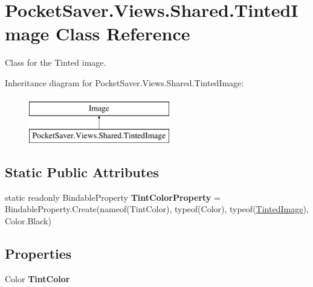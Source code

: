 \hypertarget{class_pocket_saver_1_1_views_1_1_shared_1_1_tinted_image}{}\section{Pocket\+Saver.\+Views.\+Shared.\+Tinted\+Image Class Reference}
\label{class_pocket_saver_1_1_views_1_1_shared_1_1_tinted_image}


Class for the Tinted image.  


Inheritance diagram for Pocket\+Saver.\+Views.\+Shared.\+Tinted\+Image\+:\begin{figure}[H]
\begin{center}
\leavevmode
\includegraphics[height=2.000000cm]{class_pocket_saver_1_1_views_1_1_shared_1_1_tinted_image}
\end{center}
\end{figure}
\subsection*{Static Public Attributes}
\begin{DoxyCompactItemize}
\item 
\mbox{\label{class_pocket_saver_1_1_views_1_1_shared_1_1_tinted_image_add1972fe38ceea5b39462e3e3b949e92}} 
static readonly Bindable\+Property {\bfseries Tint\+Color\+Property} = Bindable\+Property.\+Create(nameof(Tint\+Color), typeof(Color), typeof(\hyperlink{class_pocket_saver_1_1_views_1_1_shared_1_1_tinted_image}{Tinted\+Image}), Color.\+Black)
\end{DoxyCompactItemize}
\subsection*{Properties}
\begin{DoxyCompactItemize}
\item 
\mbox{\label{class_pocket_saver_1_1_views_1_1_shared_1_1_tinted_image_a00c93f802da9c98ed59805c8804c6d66}} 
Color {\bfseries Tint\+Color}
\end{DoxyCompactItemize}


